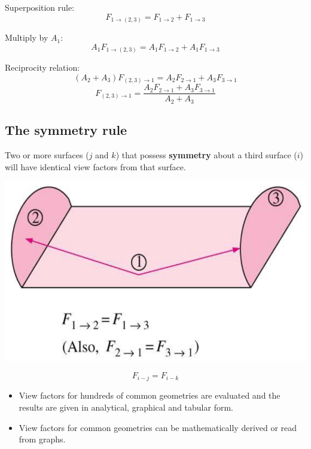 \documentclass[11pt]{article}
\begin{document}
Superposition rule:
\[F_{1 \rightarrow (2, 3)} = F_{1 \rightarrow 2} + F_{1 \rightarrow 3}\]

Multiply by \(A_1\):
\[A_1 F_{1 \rightarrow (2, 3)} = A_1 F_{1 \rightarrow 2} + A_1 F_{1 \rightarrow 3}\]

Reciprocity relation:
\[(A_2 + A_3) F_{(2, 3) \rightarrow 1} = A_2 F_{2 \rightarrow 1} + A_3 F_{3 \rightarrow 1}\]
\[F_{(2, 3) \rightarrow 1} = \frac{A_2 F_{2 \rightarrow 1} + A_3 F_{3 \rightarrow 1}}{A_2 + A_3}\]

 \newpage

\subsection{The symmetry rule}
\label{sec:org40d6198}
Two or more surfaces (\(j\) and \(k\)) that possess \textbf{symmetry} about a third surface (\(i\)) will have identical view factors from that surface.
\begin{center}
\includegraphics[width=.9\linewidth]{./images/symmetry-rule-diagram.png}
\end{center}

\[F_{i-j} = F_{i-k}\]

\begin{itemize}
\item View factors for hundreds of common geometries are evaluated and the results are given in analytical, graphical and tabular form.
\item View factors for common geometries can be mathematically derived or read from graphs.
\end{itemize}

 \newpage
\end{document}
